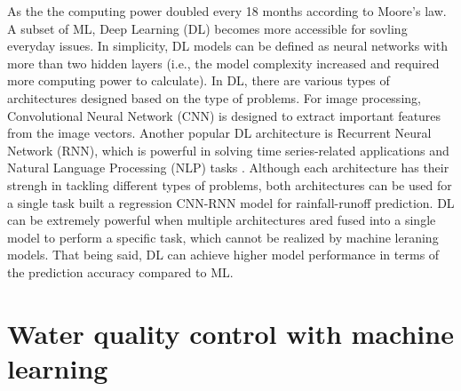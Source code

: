 As the the computing power doubled every 18 months according to Moore's law. A subset of ML, Deep Learning (DL) becomes more accessible for sovling everyday issues. In simplicity, DL models can be defined as neural networks with more than two hidden layers (i.e., the model complexity increased and required more computing power to calculate). In DL, there are various types of architectures designed based on the type of problems. For image processing, Convolutional Neural Network (CNN) is designed to extract important features from the image vectors. Another popular DL architecture is Recurrent Neural Network (RNN), which is powerful in solving time series-related applications and Natural Language Processing (NLP) tasks \citep{liERNNDesignOptimization2018}. Although each architecture has their strengh in tackling different types of problems, both architectures can be used for a single task \citet{liPredictionFlowBased2022} built a regression CNN-RNN model for rainfall-runoff prediction. DL can be extremely powerful when multiple architectures ared fused into a single model to perform a specific task, which cannot be realized by machine leraning models. That being said, DL can achieve higher model performance in terms of the prediction accuracy compared to ML. 

\section{Water quality control with machine learning}

